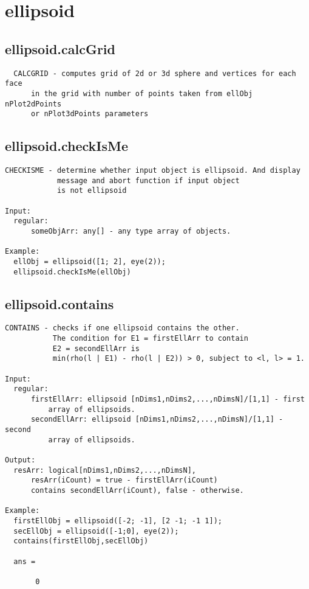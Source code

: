\section{ellipsoid}\label{secClassDescr:ellipsoid}
\subsection{\texorpdfstring{ellipsoid.calcGrid}{calcGrid}}\label{method:ellipsoid.calcGrid}
\begin{verbatim}
  CALCGRID - computes grid of 2d or 3d sphere and vertices for each face
      in the grid with number of points taken from ellObj nPlot2dPoints
      or nPlot3dPoints parameters
\end{verbatim}
\subsection{\texorpdfstring{ellipsoid.checkIsMe}{checkIsMe}}\label{method:ellipsoid.checkIsMe}
\begin{verbatim}
CHECKISME - determine whether input object is ellipsoid. And display
            message and abort function if input object
            is not ellipsoid

Input:
  regular:
      someObjArr: any[] - any type array of objects.

Example:
  ellObj = ellipsoid([1; 2], eye(2));
  ellipsoid.checkIsMe(ellObj)
\end{verbatim}
\subsection{\texorpdfstring{ellipsoid.contains}{contains}}\label{method:ellipsoid.contains}
\begin{verbatim}
CONTAINS - checks if one ellipsoid contains the other.
           The condition for E1 = firstEllArr to contain
           E2 = secondEllArr is
           min(rho(l | E1) - rho(l | E2)) > 0, subject to <l, l> = 1.

Input:
  regular:
      firstEllArr: ellipsoid [nDims1,nDims2,...,nDimsN]/[1,1] - first
          array of ellipsoids.
      secondEllArr: ellipsoid [nDims1,nDims2,...,nDimsN]/[1,1] - second
          array of ellipsoids.

Output:
  resArr: logical[nDims1,nDims2,...,nDimsN],
      resArr(iCount) = true - firstEllArr(iCount)
      contains secondEllArr(iCount), false - otherwise.

Example:
  firstEllObj = ellipsoid([-2; -1], [2 -1; -1 1]);
  secEllObj = ellipsoid([-1;0], eye(2));
  contains(firstEllObj,secEllObj)

  ans =

       0
\end{verbatim}

